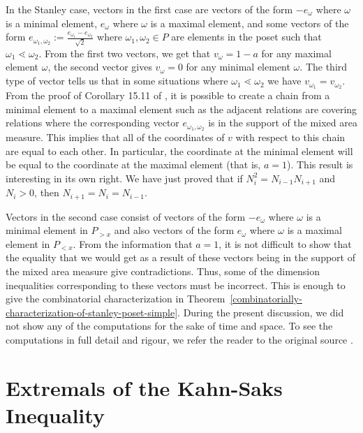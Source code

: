 \documentclass{puthesis-UG}
\begin{document}
In the Stanley case, vectors in the first case are vectors of the form $-e_{\omega}$ where $\omega$ is a minimal element, $e_\omega$ where $\omega$ is a maximal element, and some vectors of the form $e_{\omega_1,\omega_2} := \frac{e_{\omega_1} - e_{\omega_2}}{\sqrt{2}}$ where $\omega_1, \omega_2 \in P$ are elements in the poset such that $\omega_1 \lessdot \omega_2$. From the first two vectors, we get that $v_\omega = 1-a$ for any maximal element $\omega$, the second vector gives $v_\omega = 0$ for any minimal element $\omega$. The third type of vector tells us that in some situations where $\omega_1 \lessdot \omega_2$ we have $v_{\omega_1} = v_{\omega_2}$. From the proof of Corollary 15.11 of \cite{shenfeld2022extremals}, it is possible to create a chain from a minimal element to a maximal element such as the adjacent relations are covering relations where the corresponding vector $e_{\omega_1, \omega_2}$ is in the support of the mixed area measure. This implies that all of the coordinates of $v$ with respect to this chain are equal to each other. In particular, the coordinate at the minimal element will be equal to the coordinate at the maximal element (that is, $a = 1$). This result is interesting in its own right. We have just proved that if $N_i^2 = N_{i-1} N_{i+1}$ and $N_i > 0$, then $N_{i+1} = N_i = N_{i-1}$.

Vectors in the second case consist of vectors of the form $-e_\omega$ where $\omega$ is a minimal element in $P_{> x}$ and also vectors of the form $e_\omega$ where $\omega$ is a maximal element in $P_{< x}$. From the information that $a = 1$, it is not difficult to show that the equality that we would get as a result of these vectors being in the support of the mixed area measure give contradictions. Thus, some of the dimension inequalities corresponding to these vectors must be incorrect. This is enough to give the combinatorial characterization in Theorem~\ref{combinatorially-characterization-of-stanley-poset-simple}. During the present discussion, we did not show any of the computations for the sake of time and space. To see the computations in full detail and rigour, we refer the reader to the original source \cite{shenfeld2022extremals}. 

\section{Extremals of the Kahn-Saks Inequality} \label{kahn-saks-inequality}
\end{document}

